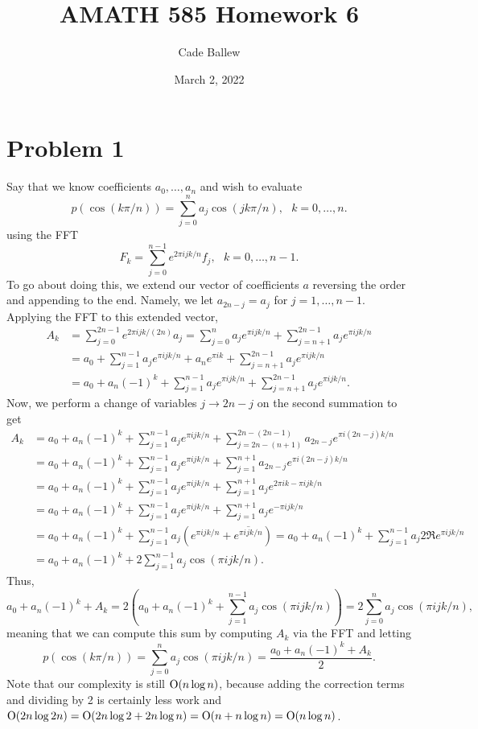 \documentclass{article}
\title{AMATH 585 Homework 6}
\author{Cade Ballew}
\date{March 2, 2022}
\begin{document}
	
\maketitle
	
\section{Problem 1}
Say that we know coefficients $a_0 , \ldots , a_n$ and wish to evaluate \begin{equation*}
p ( \cos ( k \pi / n ) ) = \sum_{j=0}^n a_j \cos ( j k \pi / n ) ,~~~k=0, \ldots , n.
\end{equation*}
using the FFT  
\[
F_k = \sum_{j=0}^{n-1} e^{2 \pi i j k / n} f_j ,~~~k=0, \ldots , n-1 .
\]
To go about doing this, we extend our vector of coefficients $a$ reversing the order and appending to the end. Namely, we let $a_{2n-j}=a_j$ for $j=1,\ldots,n-1$. Applying the FFT to this extended vector,
\begin{align*}
A_k&=\sum_{j=0}^{2n-1} e^{2 \pi i j k / (2n)} a_j=\sum_{j=0}^n a_je^{ \pi i j k / n}+\sum_{j=n+1}^{2n-1} a_je^{ \pi i j k / n}\\&=
a_0+\sum_{j=1}^{n-1} a_je^{ \pi i j k / n}+a_ne^{\pi ik}+\sum_{j=n+1}^{2n-1} a_je^{ \pi i j k / n}\\&=
a_0+a_n(-1)^k+\sum_{j=1}^{n-1} a_je^{ \pi i j k / n}+\sum_{j=n+1}^{2n-1} a_je^{ \pi i j k / n}.
\end{align*}
Now, we perform a change of variables $j\to2n-j$ on the second summation to get
\begin{align*}
A_k&=a_0+a_n(-1)^k+\sum_{j=1}^{n-1} a_je^{ \pi i j k / n}+\sum_{j=2n-(n+1)}^{2n-(2n-1)} a_{2n-j}e^{ \pi i (2n-j) k / n}\\&=
a_0+a_n(-1)^k+\sum_{j=1}^{n-1} a_je^{ \pi i j k / n}+\sum_{j=1}^{n+1} a_{2n-j}e^{ \pi i (2n-j) k / n}\\&=
a_0+a_n(-1)^k+\sum_{j=1}^{n-1} a_je^{ \pi i j k / n}+\sum_{j=1}^{n+1} a_{j}e^{2\pi ik -\pi i j k / n}\\&=
a_0+a_n(-1)^k+\sum_{j=1}^{n-1} a_je^{ \pi i j k / n}+\sum_{j=1}^{n+1} a_{j}e^{-\pi i j k / n}\\&=
a_0+a_n(-1)^k+\sum_{j=1}^{n-1} a_j\left(e^{ \pi i j k / n}+\overline{e^{ \pi i j k / n}}\right)=a_0+a_n(-1)^k+\sum_{j=1}^{n-1} a_j 2\Re e^{ \pi i j k / n}\\&=
a_0+a_n(-1)^k+2\sum_{j=1}^{n-1} a_j \cos(\pi i j k / n).
\end{align*}
Thus,
\[
a_0+a_n(-1)^k+A_k=2\left(a_0+a_n(-1)^k+\sum_{j=1}^{n-1} a_j \cos(\pi i j k / n)\right)=2\sum_{j=0}^{n} a_j \cos(\pi i j k / n),
\]
meaning that we can compute this sum by computing $A_k$ via the FFT and letting
\[
p ( \cos ( k \pi / n ) ) =\sum_{j=0}^{n} a_j \cos(\pi i j k / n)=\frac{a_0+a_n(-1)^k+A_k}{2}.
\]
Note that our complexity is still $\operatorname{O}(n\log n)$, because adding the correction terms and dividing by 2 is certainly less work and $\operatorname{O}(2n\log 2n)=\operatorname{O}(2n\log2+2n\log n)=\operatorname{O}(n+n\log n)=\operatorname{O}(n\log n)$.\\
\end{document}
